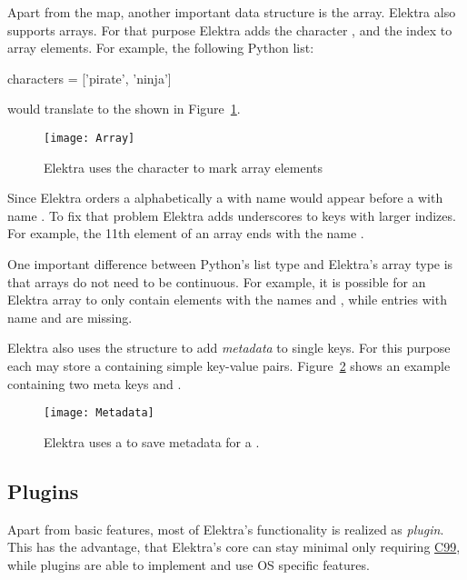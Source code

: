 Apart from the map, another important data structure is the array. Elektra also supports arrays. For that purpose Elektra adds the character \code{\#}, and the index to array elements. For example, the following Python list:

\begin{pythoncode}
  characters = ['pirate', 'ninja']
\end{pythoncode}

would translate to the  shown in Figure~\ref{fig:array}.

\begin{figure}
  \centering
    \texttt{[image: Array]}
  \caption{Elektra uses the character \code{\#} to mark array elements}
  \label{fig:array}
\end{figure}

Since Elektra orders a  alphabetically a  with name  would appear before a  with name . To fix that problem Elektra adds underscores to keys with larger indizes. For example, the 11th element of an array ends with the name .

One important difference between Python’s list type and Elektra’s array type is that arrays do not need to be continuous. For example, it is possible for an Elektra array to only contain elements with the names  and , while  entries with name  and  are missing.

Elektra also uses the  structure to add \emph{metadata} to single keys. For this purpose each  may store a  containing simple key-value pairs. Figure~\ref{fig:metadata} shows an example  containing two meta keys  and .

\begin{figure}
  \centering
    \texttt{[image: Metadata]}
  \caption{Elektra uses a  to save metadata for a .}
  \label{fig:metadata}
\end{figure}

\FloatBarrier
\subsection{Plugins}
\label{sec:plugins}

Apart from basic features, most of Elektra’s functionality is realized as \emph{plugin}. This has the advantage, that Elektra’s core can stay minimal only requiring \href{https://en.wikipedia.org/wiki/C99}{C99}, while plugins are able to implement and use OS specific features.

